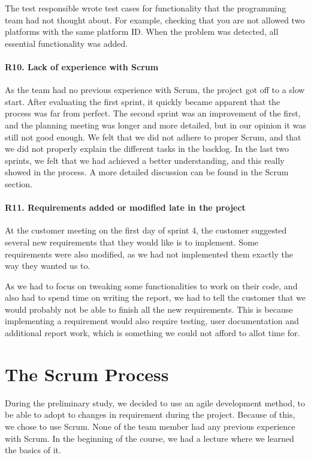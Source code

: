 The test responsible wrote test cases for functionality that the programming team had not thought about. For example, checking that you are not allowed two platforms with the same platform ID.
When the problem was detected, all essential functionality was added.

\paragraph{R10. Lack of experience with Scrum}
As the team had no previous experience with Scrum, the project got off to a slow start.
After evaluating the first sprint, it quickly became apparent that the process was far from perfect.
The second sprint was an improvement of the first, and the planning meeting was longer and more detailed, but in our opinion it was still not good enough. We felt that we did not adhere to proper Scrum, and that we did not properly explain the different tasks in the backlog. In the last two sprints, we felt that we had achieved a better understanding, and this really showed in the process. A more detailed discussion can be found in the Scrum section.

\paragraph{R11. Requirements added or modified late in the project}
At the customer meeting on the first day of sprint 4, the customer suggested several new requirements that they would like is to implement. Some requirements were also modified, as we had not implemented them exactly the way they wanted us to.

As we had to focus on tweaking some functionalities to work on their code, and also had to spend time on writing the report, we had to tell the customer that we would probably not be able to finish all the new requirements. This is because implementing a requirement would also require testing, user documentation and additional report work, which is something we could not afford to allot time for.

\section{The Scrum Process}
During the preliminary study, we decided to use an agile development method,
to be able to adopt to changes in requirement during the project.
Because of this, we chose to use Scrum. None of the team member had any previous experience with 
Scrum. In the beginning of the course, we had a lecture where we learned the basics of it.


